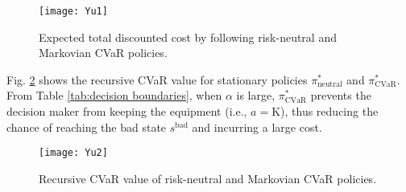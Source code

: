 \documentclass[12pt,technote,onecolumn]{IEEEtran}
\begin{document}
\begin{figure}[!tph]
	\begin{centering}
		\texttt{[image: Yu1]}
		\par\end{centering}
		\caption{Expected total discounted cost by following risk-neutral and Markovian
		CVaR policies.\label{fig:expected cost}}
\end{figure}


Fig. \ref{fig:CVaR value} shows the recursive CVaR value for stationary
policies $\pi_{\text{neutral}}^{*}$ and $\pi_{\text{CVaR}}^{*}.$ From Table \ref{tab:decision boundaries},
when $\alpha$ is large, $\pi_{\text{CVaR}}^{*}$ prevents the decision maker
from keeping the equipment (i.e., $a=\text{K}$), thus reducing the chance
of reaching the bad state $s^{\text{bad}}$ and incurring a large cost.

\begin{figure}[!tph]
	\begin{centering}
		\texttt{[image: Yu2]}
		\par\end{centering}	
		\caption{Recursive CVaR value of risk-neutral and Markovian CVaR policies.
		\label{fig:CVaR value}}
\end{figure}





%
%

\end{document}
